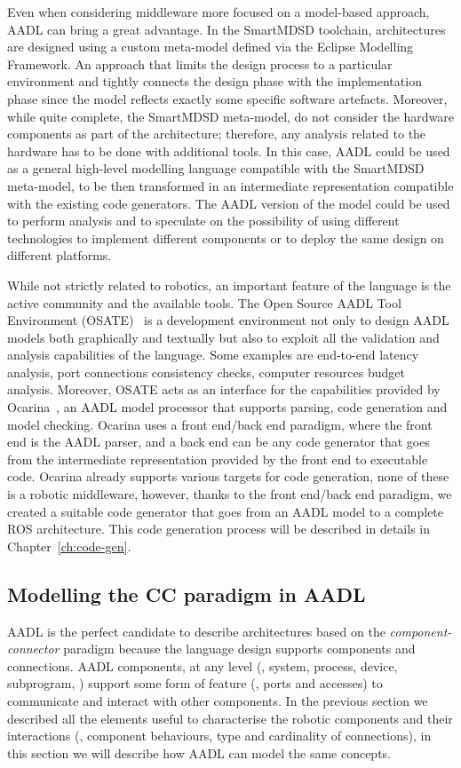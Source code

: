 Even when considering middleware more focused on a model-based approach, AADL can bring a great advantage. In the SmartMDSD toolchain, architectures are designed using a custom meta-model defined via the Eclipse Modelling Framework. An approach that limits the design process to a particular environment and tightly connects the design phase with the implementation phase since the model reflects exactly some specific software artefacts. Moreover, while quite complete, the SmartMDSD meta-model, do not consider the hardware components as part of the architecture; therefore, any analysis related to the hardware has to be done with additional tools. In this case, AADL could be used as a general high-level modelling language compatible with the SmartMDSD meta-model, to be then transformed in an intermediate representation compatible with the existing code generators. The AADL version of the model could be used to perform analysis and to speculate on the possibility of using different technologies to implement different components or to deploy the same design on different platforms.

While not strictly related to robotics, an important feature of the language is the active community and the available tools. The Open Source AADL Tool Environment (OSATE)~\cite{feiler2004open} is a development environment not only to design AADL models both graphically and textually but also to exploit all the validation and analysis capabilities of the language. Some examples are end-to-end latency analysis, port connections consistency checks, computer resources budget analysis. Moreover, OSATE acts as an interface for the capabilities provided by Ocarina~\cite{hugues2008prototype}, an AADL model processor that supports parsing, code generation and model checking. Ocarina uses a front end/back end paradigm, where the front end is the AADL parser, and a back end can be any code generator that goes from the intermediate representation provided by the front end to executable code. Ocarina already supports various targets for code generation, none of these is a robotic middleware, however, thanks to the front end/back end paradigm, we created a suitable code generator that goes from an AADL model to a complete ROS architecture. This code generation process will be described in details in Chapter~\ref{ch:code-gen}.

\subsection{Modelling the CC paradigm in AADL}
\label{sec:aadl-cnc}
AADL is the perfect candidate to describe architectures based on the \textit{component-connector} paradigm because the language design supports components and connections. AADL components, at any level (\eg, system, process, device, subprogram, \etc) support some form of feature (\ie, ports and accesses) to communicate and interact with other components. In the previous section we described all the elements useful to characterise the robotic components and their interactions (\ie, component behaviours, type and cardinality of connections), in this section we will describe how AADL can model the same concepts.

